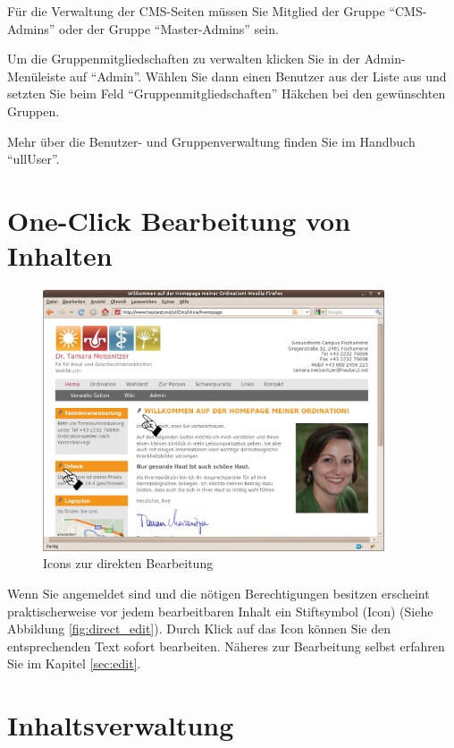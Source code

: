 \documentclass[article, a4paper, oneside, 11pt]{memoir}
\begin{document}
Für die Verwaltung der CMS-Seiten müssen Sie Mitglied der Gruppe "`CMS-Admins"' oder der Gruppe "`Master-Admins"' sein.

Um die Gruppenmitgliedschaften zu verwalten klicken Sie in der Admin-Menüleiste auf "`Admin"'. Wählen Sie dann einen Benutzer aus der Liste aus und setzten Sie beim Feld "`Gruppenmitgliedschaften"' Häkchen bei den gewünschten Gruppen.

Mehr über die Benutzer- und Gruppenverwaltung finden Sie im Handbuch "`ullUser"'.


\section{One-Click Bearbeitung von Inhalten}

\begin{figure}[htp]
\centering
\includegraphics[width=0.9\textwidth]{direct_edit}
\caption{Icons zur direkten Bearbeitung}
\label{fig:direct_edit}
\end{figure}

Wenn Sie angemeldet sind und die nötigen Berechtigungen besitzen erscheint praktischerweise vor jedem bearbeitbaren Inhalt ein Stiftsymbol (Icon) (Siehe Abbildung \vref{fig:direct_edit}). Durch Klick auf das Icon können Sie den entsprechenden Text sofort bearbeiten.
Näheres zur Bearbeitung selbst erfahren Sie im Kapitel \vref{sec:edit}.




\section{Inhaltsverwaltung}
\end{document}
